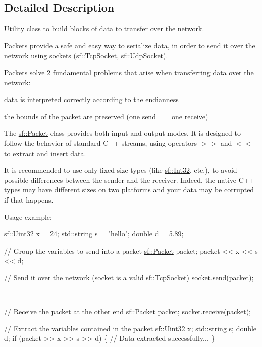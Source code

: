 \subsection{Detailed Description}
Utility class to build blocks of data to transfer over the network. 

Packets provide a safe and easy way to serialize data, in order to send it over the network using sockets (\hyperlink{classsf_1_1_tcp_socket}{sf\-::\-Tcp\-Socket}, \hyperlink{classsf_1_1_udp_socket}{sf\-::\-Udp\-Socket}).

Packets solve 2 fundamental problems that arise when transferring data over the network\-: \begin{DoxyItemize}
\item data is interpreted correctly according to the endianness \item the bounds of the packet are preserved (one send == one receive)\end{DoxyItemize}
The \hyperlink{classsf_1_1_packet}{sf\-::\-Packet} class provides both input and output modes. It is designed to follow the behavior of standard C++ streams, using operators $>$$>$ and $<$$<$ to extract and insert data.

It is recommended to use only fixed-\/size types (like \hyperlink{namespacesf_ac2dfd4952377a26dee4750e2e4a30a15}{sf\-::\-Int32}, etc.), to avoid possible differences between the sender and the receiver. Indeed, the native C++ types may have different sizes on two platforms and your data may be corrupted if that happens.

Usage example\-: 
\begin{DoxyCode}
\hyperlink{namespacesf_aa746fb1ddef4410bddf198ebb27e727c}{sf::Uint32} x = 24;
std::string s = \textcolor{stringliteral}{"hello"};
\textcolor{keywordtype}{double} d = 5.89;

\textcolor{comment}{// Group the variables to send into a packet}
\hyperlink{classsf_1_1_packet}{sf::Packet} packet;
packet << x << s << d;

\textcolor{comment}{// Send it over the network (socket is a valid sf::TcpSocket)}
socket.send(packet);

-----------------------------------------------------------------

\textcolor{comment}{// Receive the packet at the other end}
\hyperlink{classsf_1_1_packet}{sf::Packet} packet;
socket.receive(packet);

\textcolor{comment}{// Extract the variables contained in the packet}
\hyperlink{namespacesf_aa746fb1ddef4410bddf198ebb27e727c}{sf::Uint32} x;
std::string s;
\textcolor{keywordtype}{double} d;
\textcolor{keywordflow}{if} (packet >> x >> s >> d)
\{
    \textcolor{comment}{// Data extracted successfully...}
\}
\end{DoxyCode}


